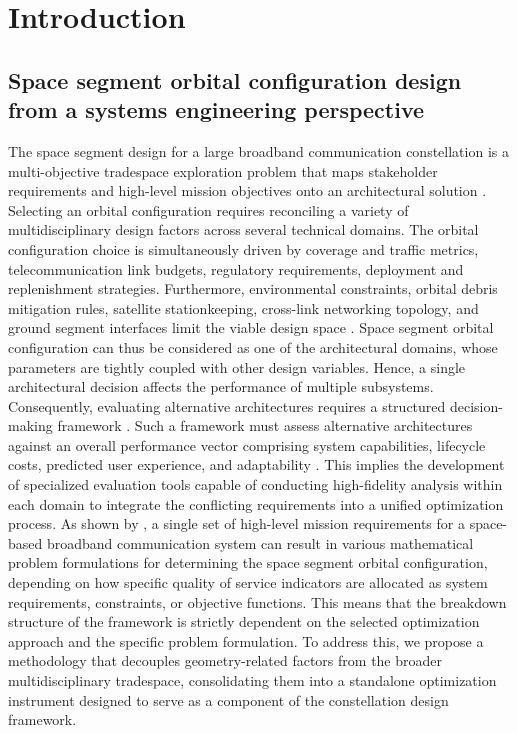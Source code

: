 \section{Introduction}
\label{sec:introduction}

\subsection{Space segment orbital configuration design from a systems engineering perspective}

The space segment design for a large broadband communication constellation is a multi-objective tradespace exploration problem that maps stakeholder requirements and high-level mission objectives onto an architectural solution \cite{crawley2016system}. Selecting an orbital configuration requires reconciling a variety of multidisciplinary design factors across several technical domains. The orbital configuration choice is simultaneously driven by coverage and traffic metrics, telecommunication link budgets, regulatory requirements, deployment and replenishment strategies. Furthermore, environmental constraints, orbital debris mitigation rules, satellite stationkeeping, cross-link networking topology, and ground segment interfaces limit the viable design space \cite{wertz2001ocdm, aerospace13030284}. Space segment orbital configuration can thus be considered as one of the architectural domains, whose parameters are tightly coupled with other design variables. Hence, a single architectural decision affects the performance of multiple subsystems. Consequently, evaluating alternative architectures requires a structured decision-making framework \cite{nasasp20166105}. Such a framework must assess alternative architectures against an overall performance vector comprising system capabilities, lifecycle costs, predicted user experience, and adaptability \cite{shaw1998distributed}. This implies the development of specialized evaluation tools capable of conducting high-fidelity analysis within each domain to integrate the conflicting requirements into a unified optimization process. As shown by \cite{deWeck2003}, a single set of high-level mission requirements for a space-based broadband communication system can result in various mathematical problem formulations for determining the space segment orbital configuration, depending on how specific quality of service indicators are allocated as system requirements, constraints, or objective functions. This means that the breakdown structure of the framework is strictly dependent on the selected optimization approach and the specific problem formulation. To address this, we propose a methodology that decouples geometry-related factors from the broader multidisciplinary tradespace, consolidating them into a standalone optimization instrument designed to serve as a component of the constellation design framework.


